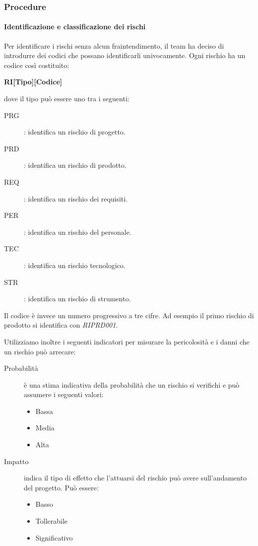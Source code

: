 \documentclass[../../norme-di-progetto.tex]{subfiles}
\begin{document}

\subsubsection{Procedure}%
\label{subs:gestione_dei_rischi/procedure}

\paragraph{Identificazione e classificazione dei rischi}%
\label{par:identificazione_e_classificazione_dei_rischi}

Per identificare i rischi senza alcun fraintendimento, il team ha deciso di introdurre dei codici che possano identificarli univocamente.
Ogni rischio ha un codice così costituito:

\begin{center}
  \textbf{RI[Tipo][Codice]}
\end{center}
dove il tipo può essere uno tra i seguenti:
\begin{description}
  \item [PRG]: identifica un rischio di progetto.
  \item [PRD]: identifica un rischio di prodotto.
  \item [REQ]: identifica un rischio dei requisiti.
  \item [PER]: identifica un rischio del personale.
  \item [TEC]: identifica un rischio tecnologico.
  \item [STR]: identifica un rischio di strumento.
\end{description}
Il codice è invece un numero progressivo a tre cifre. Ad esempio il primo rischio di prodotto si identifica con \textit{RIPRD001}.

Utilizziamo inoltre i seguenti indicatori per misurare la pericolosità e i danni che un rischio può arrecare:

\begin{description}
  \item[Probabilità] è una stima indicativa della probabilità che un rischio si verifichi e può assumere i seguenti valori:
        \begin{itemize}
          \item Bassa
          \item Media
          \item Alta
        \end{itemize}
  \item[Impatto] indica il tipo di effetto che l'attuarsi del rischio può avere sull'andamento del progetto. Può essere:
        \begin{itemize}
          \item Basso
          \item Tollerabile
          \item Significativo
        \end{itemize}
\end{description}
\end{document}
